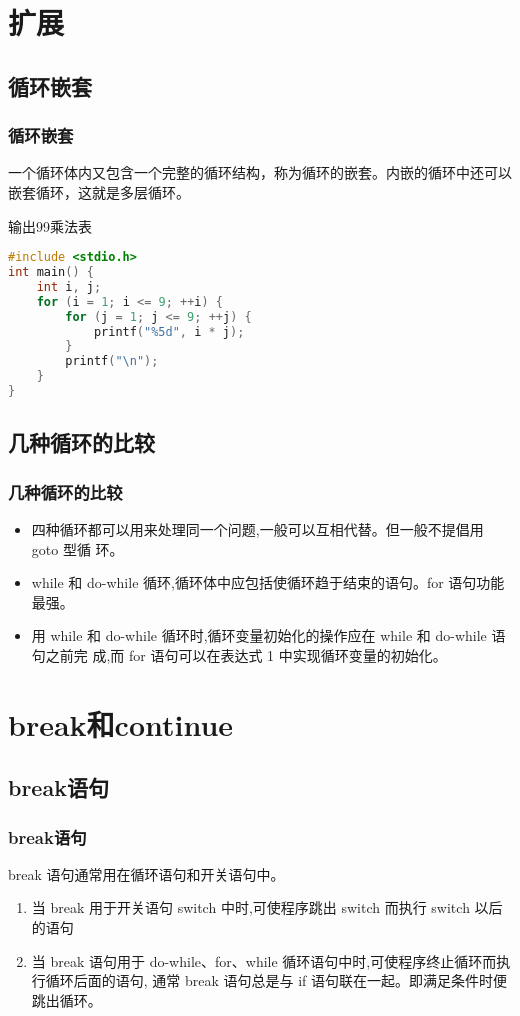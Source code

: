 \documentclass[cjk,slidestop,mathserif,hyperref={CJKbookmarks=true}]{beamer}
\begin{document}
\begin{CJK*}{UTF8}{gkai}
\section{扩展}
\subsection{循环嵌套}

\begin{frame}[fragile]
    \frametitle{循环嵌套}
    \begin{definition}
        一个循环体内又包含一个完整的循环结构，称为循环的嵌套。内嵌的循环中还可以嵌套循环，这就是多层循环。
    \end{definition}
    输出99乘法表
        \begin{lstlisting}[language=c]
#include <stdio.h>
int main() {
    int i, j;
    for (i = 1; i <= 9; ++i) {
        for (j = 1; j <= 9; ++j) {
            printf("%5d", i * j);
        }
        printf("\n");
    }
}
        \end{lstlisting}
\end{frame}

\subsection{几种循环的比较}
\begin{frame}[fragile]
    \frametitle{几种循环的比较}
    \begin{itemize}
        \item 四种循环都可以用来处理同一个问题,一般可以互相代替。但一般不提倡用 goto 型循
环。
        \item while 和 do-while 循环,循环体中应包括使循环趋于结束的语句。for 语句功能最强。
        \item 用 while 和 do-while 循环时,循环变量初始化的操作应在 while 和 do-while 语句之前完
成,而 for 语句可以在表达式 1 中实现循环变量的初始化。
    \end{itemize}
\end{frame}

\section{break和continue}
\subsection{break语句}
\begin{frame}[fragile]
    \frametitle{break语句}
    \begin{definition}
        break 语句通常用在循环语句和开关语句中。
        \begin{enumerate}
            \item 当 break 用于开关语句 switch 中时,可使程序跳出 switch 而执行 switch 以后的语句
            \item 当 break 语句用于 do-while、for、while 循环语句中时,可使程序终止循环而执行循环后面的语句, 通常 break 语句总是与 if 语句联在一起。即满足条件时便跳出循环。
        \end{enumerate}
    \end{definition}
\end{frame}


\end{CJK*}
\end{document}

